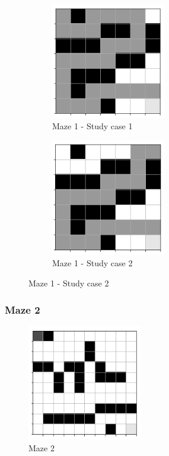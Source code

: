 \documentclass[a4paper]{article}    %
\begin{document}
\begin{figure}[H]
    \centering
    \begin{subfigure}{0.48\textwidth}
        \centering
        \includegraphics[width=5cm]{maze1-case1}
        \caption{Maze 1 - Study case 1}
        \label{fig:maze1-case1}
    \end{subfigure}
    \hfill
    \begin{subfigure}{0.48\textwidth}
        \centering
        \includegraphics[width=5cm]{maze1-case2}
        \caption{Maze 1 - Study case 2}
        \label{fig:maze1-case2}
    \end{subfigure}
\end{figure}

\newpage
\subsubsection{Maze 2}

\begin{figure}[H]
    \centering
    \includegraphics[width=5cm]{maze2-maze}
    \caption{Maze 2}
    \label{fig:maze2}
\end{figure}
\end{document}
